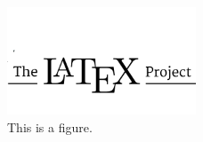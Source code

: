 \begin{figure}[htbp]
  \centering
  \includegraphics[width=0.5\textwidth]{figure.png}
  \caption{This is a figure.}
  \label{fig:figure}
\end{figure}
